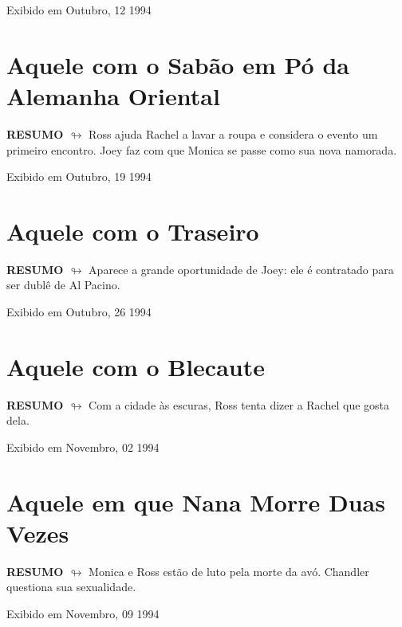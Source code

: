 \begin{flushright}
\textcolor{gray600}{Exibido em Outubro, 12 1994}
\end{flushright}


\chapter{Aquele com o Sabão em Pó da Alemanha Oriental}

\textbf{RESUMO $\looparrowright$} Ross ajuda Rachel a lavar a roupa e considera o evento um primeiro encontro. Joey faz com que Monica se passe como sua nova namorada.

\begin{flushright}
\textcolor{gray600}{Exibido em Outubro, 19 1994}
\end{flushright}


\chapter{Aquele com o Traseiro}

\textbf{RESUMO $\looparrowright$} Aparece a grande oportunidade de Joey: ele é contratado para ser dublê de Al Pacino.

\begin{flushright}
\textcolor{gray600}{Exibido em Outubro, 26 1994}
\end{flushright}


\chapter{Aquele com o Blecaute}

\textbf{RESUMO $\looparrowright$} Com a cidade às escuras, Ross tenta dizer a Rachel que gosta dela.

\begin{flushright}
\textcolor{gray600}{Exibido em Novembro, 02 1994}
\end{flushright}


\chapter{Aquele em que Nana Morre Duas Vezes}

\textbf{RESUMO $\looparrowright$} Monica e Ross estão de luto pela morte da avó. Chandler questiona sua sexualidade.

\begin{flushright}
\textcolor{gray600}{Exibido em Novembro, 09 1994}
\end{flushright}


